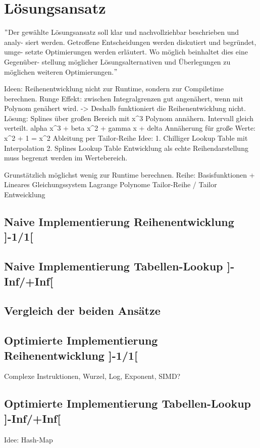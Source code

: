 \documentclass[course=erap]{aspdoc}
\begin{document}
    \section{Lösungsansatz}
    \("\)Der gewählte Lösungsansatz soll klar und nachvollziehbar beschrieben und analy- siert werden.
    Getroffene Entscheidungen werden diskutiert und begründet, umge- setzte Optimierungen werden erläutert.
    Wo möglich beinhaltet dies eine Gegenüber- stellung möglicher Lösungsalternativen und Überlegungen zu möglichen weiteren Optimierungen.\("\)

    Ideen: Reihenentwicklung nicht zur Runtime, sondern zur Compiletime berechnen.
    Runge Effekt: zwischen Integralgrenzen gut angenähert, wenn mit Polynom genähert wird. -> Deshalb funktioniert die Reihenentwicklung nicht.
    Lösung: Splines über großen Bereich mit x^3 Polynom annähern. Intervall gleich verteilt. alpha x^3 + beta x^2 + gamma x + delta
    Annäherung für große Werte: x^2 + 1 = x^2
    Ableitung per Tailor-Reihe
    Idee: 1. Chilliger Lookup Table mit Interpolation 2. Splines Lookup Table
    Entwicklung als echte Reihendarstellung muss begrenzt werden im Wertebereich.

    Grunstätzlich möglichst wenig zur Runtime berechnen.
    Reihe: Basisfunktionen + Lineares Gleichungssystem
    Lagrange Polynome
    Tailor-Reihe / Tailor Entweicklung

    \subsection{Naive Implementierung Reihenentwicklung ]-1/1[}

    \subsection{Naive Implementierung Tabellen-Lookup ]-Inf/+Inf[}

    \subsection{Vergleich der beiden Ansätze}

    \subsection{Optimierte Implementierung Reihenentwicklung ]-1/1[}
    Complexe Instruktionen, Wurzel, Log, Exponent, SIMD?

    \subsection{Optimierte Implementierung Tabellen-Lookup ]-Inf/+Inf[}
    Idee: Hash-Map
\end{document}
